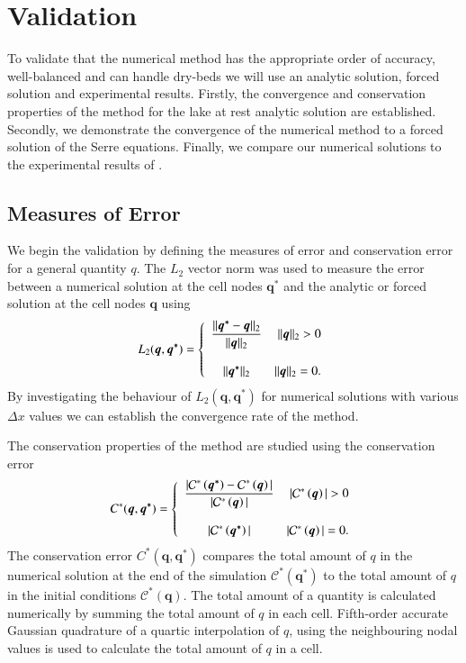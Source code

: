 \documentclass[times]{elsarticle}
\newcommand{\vecn}[1]{\boldsymbol{#1}}
\begin{document}
\section{Validation}
To validate that the numerical method has the appropriate order of accuracy, well-balanced and can handle dry-beds we will use an analytic solution, forced solution and experimental results. Firstly, the convergence and conservation properties of the method for the lake at rest analytic solution are established. Secondly, we demonstrate the convergence of the numerical method to a forced solution of the Serre equations. Finally, we compare our numerical solutions to the experimental results of \citet{Synolakis-1987-523}.


\subsection{Measures of Error}
We begin the validation by defining the measures of error and conservation error for a general quantity $q$. The $L_2$ vector norm was used to measure the error between a numerical solution at the cell nodes $\vecn{q^*}$ and the analytic or forced solution at the cell nodes $\vecn{q}$ using
\begin{equation*}
L_2(\vecn{q},\vecn{q^*}) =  \left\lbrace \begin{array}{c r}
\dfrac{||\vecn{q^*} - \vecn{q}||_{2}}{||\vecn{q}||_{2}} & ||\vecn{q}||_{2} > 0 \\ \\
{||\vecn{q^*}||_{2}} & ||\vecn{q}||_{2} = 0 . \end{array}\right.
\label{eqn:L1qdef}
\end{equation*}
By investigating the behaviour of $L_2(\vecn{q},\vecn{q^*})$ for numerical solutions with various $\Delta x$ values we can establish the convergence rate of the method.

The conservation properties of the method are studied using the conservation error
\begin{equation*}
C^*(\vecn{q},\vecn{q^*}) =  \left\lbrace \begin{array}{c r}
\dfrac{|\mathcal{C}^*\left({\vecn{q^*}}\right) - \mathcal{C}^*\left({\vecn{q}}\right)| }{|\mathcal{C}^*\left({\vecn{q}}\right)|} & |\mathcal{C}^*\left({\vecn{q}}\right)| > 0 \\ \\
|\mathcal{C}^*\left({\vecn{q^*}}\right)| & |\mathcal{C}^*\left({\vecn{q}}\right)| = 0  . \end{array}\right.
\end{equation*}
The conservation error $C^*(\vecn{q},\vecn{q^*})$ compares the total amount of $q$ in the numerical solution at the end of the simulation $\mathcal{C}^*\left({\vecn{q^*}}\right)$ to the total amount of $q$ in the initial conditions $\mathcal{C}^*\left({\vecn{q}}\right)$. The total amount of a quantity is calculated numerically by summing the total amount of $q$ in each cell. Fifth-order accurate Gaussian quadrature of a quartic interpolation of $q$, using the neighbouring nodal values is used to calculate the total amount of $q$ in a cell.
\end{document}
